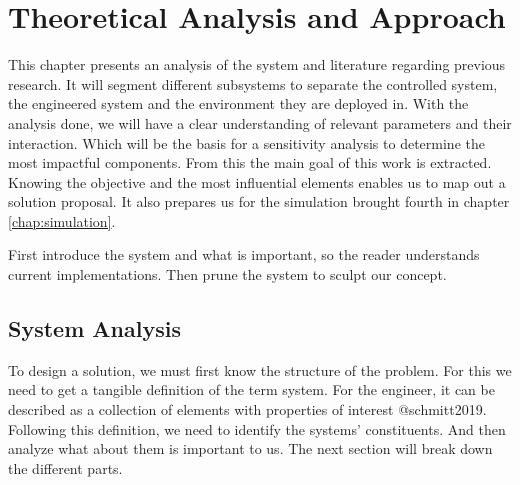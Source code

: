 \chapter{Theoretical Analysis and Approach}
\label{chap:analysis-and-arch}
This chapter presents an analysis of the system and literature regarding previous research.
It will segment different subsystems to separate the controlled system, the engineered system and the environment they are deployed in.
With the analysis done, we will have a clear understanding of relevant parameters and their interaction.
Which will be the basis for a sensitivity analysis to determine the most impactful components.
From this the main goal of this work is extracted.
Knowing the objective and the most influential elements enables us to map out a solution proposal.
It also prepares us for the simulation brought fourth in chapter \ref{chap:simulation}.

First introduce the system and what is important, so the reader understands current implementations.
Then prune the system to sculpt our concept.


%
\section{System Analysis}
\label{sec:system-analysis}
To design a solution, we must first know the structure of the problem. %
For this we need to get a tangible definition of the term system.
For the engineer, it can be described as a collection of elements with properties of interest @schmitt2019.
Following this definition, we need to identify the systems' constituents.
And then analyze what about them is important to us.
The next section will break down the different parts.

